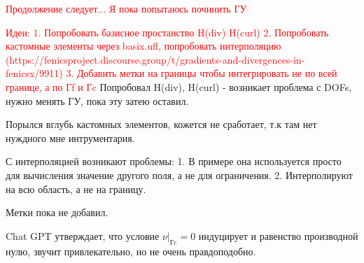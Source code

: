 \documentclass[a4paper,12pt]{article}
\begin{document}
\textcolor{red}{Продолжение следует... Я пока попытаюсь починить ГУ}

\par
\textcolor{red}{Идеи:
1. Попробовать базисное простанство H(div) H(curl)
2. Попробовать кастомные элементы через basix.ufl, попробовать интерполяцию (https://fenicsproject.discourse.group/t/gradients-and-divergences-in-fenicsx/9911)
3. Добавить метки на границы чтобы интегрировать не по всей границе, а по Гf и Гc}
Попробовал H(div), H(curl) - возникает проблема с DOFs, нужно менять ГУ, пока эту затею оставил. \par
Порылся вглубь кастомных элементов, кожется не сработает, т.к там нет нуждного мне интрументария. \par
С интерполяцией возникают проблемы: 1. В примере она используется просто для вычисления значение другого поля, а не для ограничения. 2. Интерполируют на всю область, а не на границу. \par
Метки пока не добавил. \par
Chat GPT утверждает, что условие $\nu|_\text{Гc} = 0$ индуцирует и равенство производной нулю, звучит привлекательно, но не очень правдоподобно.
\end{document}
